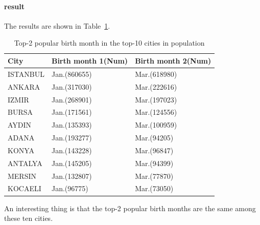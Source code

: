 \documentclass{article}
\begin{document}
\paragraph{result}
The results are shown in Table~\ref{table-2}.
\begin{table}[ht]
\centering
\caption{ Top-2 popular birth month in the top-10 cities in population}
\label{table-2}
\begin{tabular}{lll}
\toprule
City & Birth month 1(Num) & Birth month 2(Num) \\
\midrule
ISTANBUL & Jan.(860655) & Mar.(618980)  \\
ANKARA & Jan.(317030) & Mar.(222616)  \\
IZMIR & Jan.(268901) & Mar.(197023)  \\
BURSA & Jan.(171561) & Mar.(124556)  \\
AYDIN & Jan.(135393) & Mar.(100959)  \\
ADANA & Jan.(193277) & Mar.(94205)  \\
KONYA & Jan.(143228) & Mar.(96847)  \\
ANTALYA & Jan.(145205) & Mar.(94399)  \\
MERSIN & Jan.(132807) & Mar.(77870)  \\
KOCAELI & Jan.(96775) & Mar.(73050)  \\
\bottomrule
\end{tabular}
\end{table}
An interesting thing is that the top-2 popular birth months are the same among these ten cities.




%
%
\end{document}
